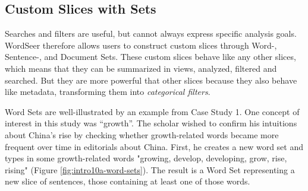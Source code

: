 \documentclass{sig-alternate}
\begin{document}
\subsection{Custom Slices with Sets}

Searches and filters are useful, but cannot always express  specific analysis goals. WordSeer therefore allows users to construct custom slices through Word-, Sentence-, and Document Sets. These custom slices behave like any other slices, which means that they can be summarized in views,  analyzed, filtered and searched. But they are more powerful that other slices because they also behave like metadata, transforming them into \emph{categorical filters}.

Word Sets are well-illustrated by an example from Case Study 1.  One concept of interest in this study was ``growth''. The scholar wished to confirm his intuitions about China's rise by checking whether  growth-related words became more frequent over time in editorials about China. First, he creates a new word set and types in some growth-related words "growing, develop, developing, grow, rise, rising" (Figure \ref{fig:intro10a-word-sets}). The result is a Word Set representing a new slice of sentences, those containing at least one of those words. 
\end{document}
